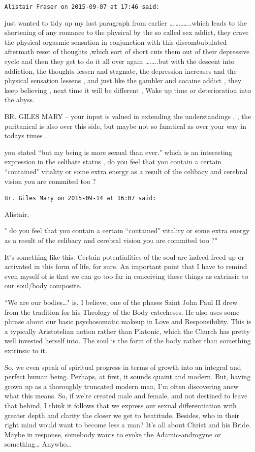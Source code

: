 \begin{footnotesize}
\begin{sffamily}
\hfill

\texttt{Alistair Fraser on 2015-09-07 at 17:46 said: }

just wanted to tidy up my last paragraph from earlier …………..which leads to the shortening of any romance to the physical by the so called sex addict, they crave the physical orgasmic sensation in conjunction with this discombubulated aftermath reset of thoughts ,which sort of short cuts them out of their depressive cycle and then they get to do it all over again ……..but with the descent into addiction, the thoughts lessen and stagnate, the depression increases and the physical sensation lessens , and just like the gambler and cocaine addict , they keep believing , next time it will be different , Wake up time or deterioration into the abyss.

BR. GILES MARY – your input is valued in extending the understandings , , the puritanical is also over this side, but maybe not so fanatical as over your way in todays times .

you stated ``but my being is more sexual than ever." which is an interesting expression in the celibate status , do you feel that you contain a certain ``contained" vitality or some extra energy as a result of the celibacy and cerebral vision you are commited too ?


\hfill


\hfill

\texttt{Br. Giles Mary on 2015-09-14 at 16:07 said: }

Alistair,

" do you feel that you contain a certain ``contained" vitality or some extra energy as a result of the celibacy and cerebral vision you are commited too ?" 

It's something like this. Certain potentialities of the soul are indeed freed up or activated in this form of life, for sure. An important point that I have to remind even myself of is that we can go too far in conceiving these things as extrinsic to our soul/body composite. 

``We are our bodies…" is, I believe, one of the phases Saint John Paul II drew from the tradition for his Theology of the Body catecheses. He also uses some phrase about our basic psychosomatic makeup in Love and Responsibility. This is a typically Aristotelian notion rather than Platonic, which the Church has pretty well invested herself into. The soul is the form of the body rather than something extrinsic to it. 

So, we even speak of spiritual progress in terms of growth into an integral and perfect human being. Perhaps, at first, it sounds quaint and modern. But, having grown up as a thoroughly truncated modern man, I'm often discovering anew what this means. So, if we're created male and female, and not destined to leave that behind, I think it follows that we express our sexual differentiation with greater depth and clarity the closer we get to beatitude. Besides, who in their right mind would want to become less a man? It's all about Christ and his Bride. Maybe in response, somebody wants to evoke the Adamic-androgyne or something… Anywho…


\end{sffamily}
\end{footnotesize}

